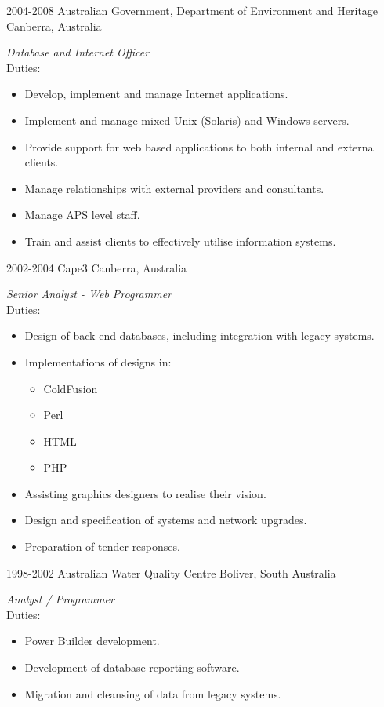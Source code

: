 \documentclass[]{friggeri-cv} %
\begin{document}
\begin{entrylist}
\entry
{2004-2008}
{Australian Government, Department of Environment and Heritage}
{Canberra, Australia}
{\emph{Database and Internet Officer} \\
Duties:
\begin{itemize}
\item Develop, implement and manage Internet applications.
\item Implement and manage mixed Unix (Solaris) and Windows servers.
\item Provide support for web based applications to both internal and external clients.
\item Manage relationships with external providers and consultants.
\item Manage APS level staff.
\item Train and assist clients to effectively utilise information systems.
\end{itemize}}
\entry
{2002-2004}
{Cape3}
{Canberra, Australia}
{\emph{Senior Analyst - Web Programmer} \\
Duties:
\begin{itemize}
\item Design of back-end databases, including integration with legacy systems.
\item Implementations of designs in:
\begin{itemize}
\item ColdFusion
\item Perl
\item HTML
\item PHP
\end{itemize}
\item Assisting graphics designers to realise their vision.
\item Design and specification of systems and network upgrades.
\item Preparation of tender responses.
\end{itemize}}
\entry
{1998-2002}
{Australian Water Quality Centre}
{Boliver, South Australia}
{\emph{Analyst / Programmer} \\
Duties:
\begin{itemize}
\item Power Builder development.
\item Development of database reporting software.
\item Migration and cleansing of data from legacy systems.

\end{itemize}}
\end{entrylist}
\end{document}
